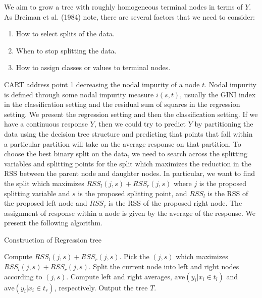 \documentclass[12pt,twoside]{reedthesis}
\theoremstyle{definition}
\theoremstyle{definition}
\theoremstyle{definition}
\theoremstyle{remark}
\begin{document}
We aim to grow a tree with roughly homogeneous terminal nodes in terms
of \(Y\). As Breiman et al. (1984) note, there are several factors that
we need to consider:
\begin{enumerate}
        \item How to select splits of the data.
        
        \item When to stop splitting the data.
        
        \item How to assign classes or values to terminal nodes. 
    \end{enumerate}
CART address point 1 decreasing the nodal impurity of a node \(t\).
Nodal impurity is defined through some nodal impurity measure
\(i(s,t)\), usually the GINI index in the classification setting and the
residual sum of squares in the regression setting. We present the
regression setting and then the classification setting. If we have a
continuous response \(Y\), then we could try to predict \(Y\) by
partitioning the data using the decision tree structure and predicting
that points that fall within a particular partition will take on the
average response on that partition. To choose the best binary split on
the data, we need to search across the splitting variables and splitting
points for the split which maximizes the reduction in the RSS between
the parent node and daughter nodes. In particular, we want to find the
split which maximizes \(RSS_l(j,s)+RSS_r(j,s)\) where \(j\) is the
proposed splitting variable and \(s\) is the proposed splitting point,
and \(RSS_l\) is the RSS of the proposed left node and \(RSS_r\) is the
RSS of the proposed right node. The assignment of response within a node
is given by the average of the response. We present the following
algorithm. \par
\begin{algorithm}
        \caption{Construction of Regression tree}\label{regression tree}
        \begin{algorithmic}[1]
                    \State Compute $RSS_l(j,s)+RSS_r(j,s)$.
                    \EndFor
                    \State Pick the $(j,s)$ which maximizes $RSS_l(j,s)+RSS_r(j,s)$.
                    \State Split the current node into left and right nodes according to $(j,s)$.
                    \State Compute left and right averages, $\text{ave}(y_i|x_i\in t_l)$ and $\text{ave}(y_i|x_i\in t_r)$, respectively. 
                \EndFor
                \State Output the tree $T$.
            \EndWhile
        \end{algorithmic}
    \end{algorithm}
\end{document}
